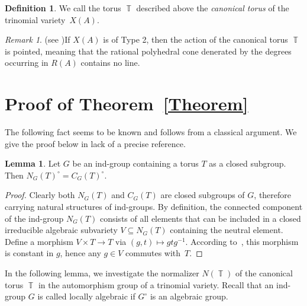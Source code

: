 \documentclass[a4paper,reqno,12pt]{amsart}
\theoremstyle{theorem}
\theoremstyle{definition}
\newtheorem{definition}[theorem]{Definition}
\theoremstyle{theorem}
\newtheorem{lemma}[theorem]{Lemma}
\theoremstyle{remark}
\newtheorem{remark}[theorem]{Remark}
\DeclareMathOperator{\TT}{\mathbb T}
\newcommand{\0}{\circ}
\begin{document}
\begin{definition}
     We call the torus $\TT$ described above the \textit{canonical torus} of the trinomial variety~$X(A)$.
\end{definition}

\begin{remark} (see \cite{HW})\label{RemarkPoint}
    If $X(A)$ is of Type 2, then the action of the canonical torus $\TT$ is pointed, meaning that the rational polyhedral cone denerated by the degrees occurring in $R(A)$ contains no line.
\end{remark}


\section{Proof of Theorem~\ref{Theorem}}  
The following fact seems to be known and follows from a classical argument. We give the proof below in lack of a precise reference.

\begin{lemma}\label{LemmaHumphreys}
    Let $G$ be an ind-group containing a torus $T$ as a closed subgroup. Then $N_G(T)^\circ = C_G(T)^\circ$.
\end{lemma}
\begin{proof}
    Clearly both $N_G(T)$ and $C_G(T)$ are closed subgroups of $G$, therefore carrying natural structures of ind-groups. By definition, the connected component of the ind-group $N_G(T)$ consists of all elements that can be included in a closed irreducible algebraic subvariety $V\subseteq N_G(T)$ containing the neutral element. Define a morphism $V\times T\to T$ via $(g, t)\longmapsto g tg^{-1}$. According to~\cite[Proposition in 16.3]{H}, this morphism is constant in $g$, hence any $g\in V$ commutes with~$T$.
\end{proof}

In the following lemma, we investigate the normalizer $N(\TT)$ of the canonical torus $\TT$ in the automorphism group of a trinomial variety. Recall that an ind-group $G$ is called locally algebraic if $G^\circ$ is an algebraic group.
\end{document}
